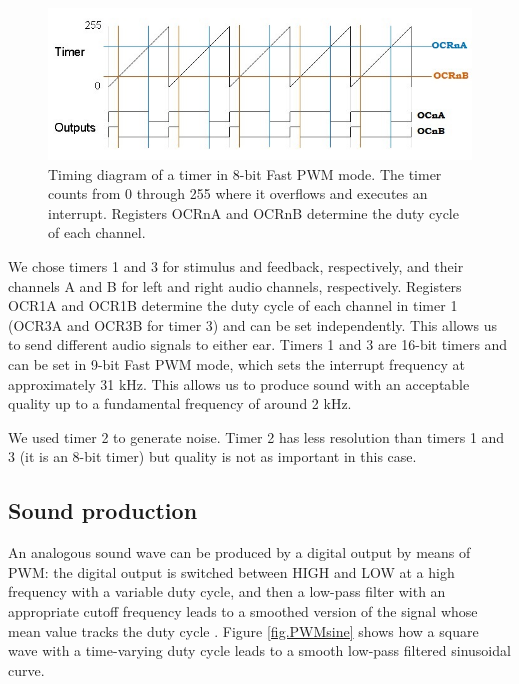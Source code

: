\documentclass[twocolumn]{article}
\begin{document}
\begin{figure}[ht]
    \centering
    \includegraphics[width=\linewidth]{figures/FastPWM_cb.jpg}
    \caption{Timing diagram of a timer in 8-bit Fast PWM mode. The timer counts from 0 through 255 where it overflows and executes an interrupt. Registers OCRnA and OCRnB determine the duty cycle of each channel.}
    \label{fig.FastPWM}
\end{figure}

We chose timers 1 and 3 for stimulus and feedback, respectively, and their channels A and B for left and right audio channels, respectively. Registers OCR1A and OCR1B determine the duty cycle of each channel in timer 1 (OCR3A and OCR3B for timer 3) and can be set independently. This allows us to send different audio signals to either ear. Timers 1 and 3 are 16-bit timers and can be set in 9-bit Fast PWM mode, which sets the interrupt frequency at approximately 31 kHz. This allows us to produce sound with an acceptable quality up to a fundamental frequency of around 2 kHz.

We used timer 2 to generate noise. Timer 2 has less resolution than timers 1 and 3 (it is an 8-bit timer) but quality is not as important in this case.


\subsection{Sound production}
\label{sec.sonido}

An analogous sound wave can be produced by a digital output by means of PWM: the digital output is switched between HIGH and LOW at a high frequency with a variable duty cycle, and then a low-pass filter with an appropriate cutoff frequency leads to a smoothed version of the signal whose mean value tracks the duty cycle \cite{arduinofading}. Figure \ref{fig.PWMsine} shows how a square wave with a time-varying duty cycle leads to a smooth low-pass filtered sinusoidal curve.
\end{document}
